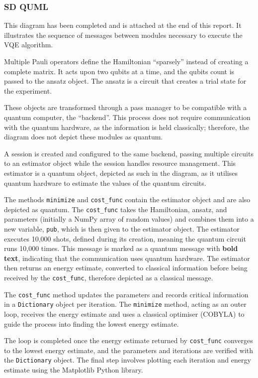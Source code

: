 \documentclass{article}
\begin{document}
{\subsubsection{SD QUML}

This diagram has been completed and is attached at the end of this report. It illustrates the sequence of messages between modules necessary to execute the VQE algorithm. 

Multiple Pauli operators define the Hamiltonian “sparsely” instead of creating a complete matrix. It acts upon two qubits at a time, and the qubits count is passed to the ansatz object. The ansatz is a circuit that creates a trial state for the experiment. 

These objects are transformed through a pass manager to be compatible with a quantum computer, the “backend”. This process does not require communication with the quantum hardware, as the information is held classically; therefore, the diagram does not depict these modules as quantum.

A session is created and configured to the same backend, passing multiple circuits to an estimator object while the session handles resource management. This estimator is a quantum object, depicted as such in the diagram, as it utilises quantum hardware to estimate the values of the quantum circuits. 

The methods \texttt{minimize} and \texttt{cost\_func} contain the estimator object and are also depicted as quantum. The \texttt{cost\_func} takes the Hamiltonian, ansatz, and parameters (initially a NumPy array of random values) and combines them into a new variable, \texttt{pub}, which is then given to the estimator object. The estimator executes 10,000 shots, defined during its creation, meaning the quantum circuit runs 10,000 times. This message is marked as a quantum message with \textbf{bold text}, indicating that the communication uses quantum hardware. The estimator then returns an energy estimate, converted to classical information before being received by the \texttt{cost\_func}, therefore depicted as a classical message.

The \texttt{cost\_func} method updates the parameters and records critical information in a \texttt{Dictionary} object per iteration. The \texttt{minimize} method, acting as an outer loop, receives the energy estimate and uses a classical optimiser (COBYLA) to guide the process into finding the lowest energy estimate.

The loop is completed once the energy estimate returned by \texttt{cost\_func} converges to the lowest energy estimate, and the parameters and iterations are verified with the \texttt{Dictionary} object. The final step involves plotting each iteration and energy estimate using the Matplotlib Python library.

}
\end{document}
